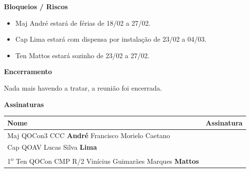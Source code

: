\documentclass[12pt,a4paper]{article}
\begin{document}
\vspace{1em}

\textbf{Bloqueios / Riscos}

\begin{itemize}
\item Maj André estará de férias de 18/02 a 27/02.
\item Cap Lima estará com dispensa por instalação de 23/02 a 04/03.
\item Ten Mattos estará sozinho de 23/02 a 27/02.
\end{itemize}

\vspace{2em}

\textbf{Encerramento}

Nada mais havendo a tratar, a reunião foi encerrada.

\vspace{3em}

\textbf{Assinaturas}

\vspace{1em}

\begin{longtable}{|p{6cm}|p{9cm}|}
\hline
\textbf{Nome} & \textbf{Assinatura} \\
\hline
Maj QOCon3 CCC \textbf{André} Francisco Morielo Caetano & \\[2.5cm]
\hline
Cap QOAV Lucas Silva \textbf{Lima} & \\[2.5cm]
\hline
1\textsuperscript{o} Ten QOCon CMP R/2 Vinícius Guimarães Marques \textbf{Mattos} & \\[2.5cm]
\hline
\end{longtable}
\end{document}
